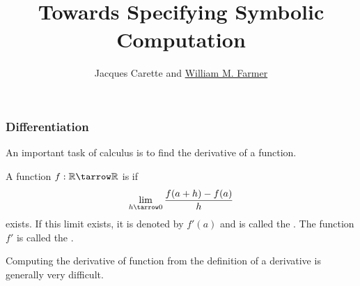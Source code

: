 \documentclass[t,12pt,numbers,fleqn]{beamer}
\title{ {\normalsize \bgreen{\bf CICM 2019}}\\[1.5ex]
  {\large \bf Towards Specifying Symbolic Computation}
\vspace{-1.5ex}
}
\author[Farmer]{
Jacques Carette and \underline{William M. Farmer}\\
\vspace*{-1.5ex}
}
\institute{
Department of Computing and Software\\
McMaster University
\vspace*{-1.5ex}
}
\date{
{\small 9 July 2019}

\bc
 \includegraphics[scale = 0.2, keepaspectratio]
{$HOME/doc/images/mcmaster-logo-full-color.jpg}%
\ec
}
\begin{document}

\begin{frame}
\vspace{-1.5ex} 
\titlepage
\end{frame}



\begin{frame}
\frametitle{Differentiation}
\bi

  \item An important task of calculus is to find the derivative of a
    function.

  \item A function $f : \mathbb{R} \tarrow \mathbb{R}$ is
     if \[\lim_{h \tarrow 0} \frac{f(a +
      h) - f(a)}{h}\] exists.  If this limit exists, it is
    denoted by $f'(a)$ and is called the .  The function $f'$ is called the .

  \item Computing the derivative of function from the definition of a
    derivative is generally very difficult.

\ei
\end{frame}

\end{document}
